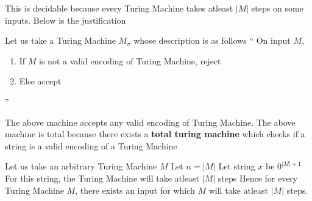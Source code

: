This is decidable because every Turing Machine takes atleast $|M|$ steps on some inputs. Below is the justification

Let us take a Turing Machine $M_\sigma$ whose description is as follows
\newline
``
\newline
    On input $M$,
    \begin{enumerate}
        \item If $M$ is not a valid encoding of Turing Machine, reject
        \item Else accept
    \end{enumerate}
''


The above machine accepts any valid encoding of Turing Machine. The above machine is total because there exists a \textbf{total turing machine} which checks if a string is a valid encoding of a Turing Machine


Let us take an arbitrary Turing Machine $M$
\newline
Let $n = |M|$
\newline
Let string $x$ be $0^{|M| + 1}$
\newline
For this string, the Turing Machine will take atleast $|M|$ steps
\newline
Hence for every Turing Machine $M$, there exists an input for which $M$ will take atleast $|M|$ steps.






